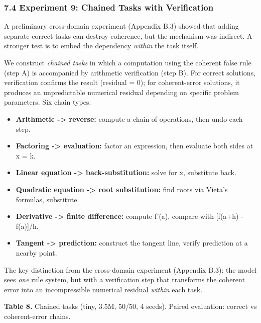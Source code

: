 \documentclass[
  11pt,
]{article}
\providecommand{\tightlist}{%
  \setlength{\itemsep}{0pt}\setlength{\parskip}{0pt}}
\begin{document}
\subsubsection{7.4 Experiment 9: Chained Tasks with
Verification}\label{experiment-9-chained-tasks-with-verification}

A preliminary cross-domain experiment (Appendix B.3) showed that adding
separate correct tasks can destroy coherence, but the mechanism was
indirect. A stronger test is to embed the dependency \emph{within} the
task itself.

We construct \emph{chained tasks} in which a computation using the
coherent false rule (step A) is accompanied by arithmetic verification
(step B). For correct solutions, verification confirms the result
(residual = 0); for coherent-error solutions, it produces an
unpredictable numerical residual depending on specific problem
parameters. Six chain types:

\begin{itemize}
\tightlist
\item
  \textbf{Arithmetic -\textgreater{} reverse:} compute a chain of
  operations, then undo each step.
\item
  \textbf{Factoring -\textgreater{} evaluation:} factor an expression,
  then evaluate both sides at x = k.
\item
  \textbf{Linear equation -\textgreater{} back-substitution:} solve for
  x, substitute back.
\item
  \textbf{Quadratic equation -\textgreater{} root substitution:} find
  roots via Vieta's formulas, substitute.
\item
  \textbf{Derivative -\textgreater{} finite difference:} compute f'(a),
  compare with {[}f(a+h) - f(a){]}/h.
\item
  \textbf{Tangent -\textgreater{} prediction:} construct the tangent
  line, verify prediction at a nearby point.
\end{itemize}

The key distinction from the cross-domain experiment (Appendix B.3): the
model sees \emph{one} rule system, but with a verification step that
transforms the coherent error into an incompressible numerical residual
\emph{within} each task.

\textbf{Table 8.} Chained tasks (tiny, 3.5M, 50/50, 4 seeds). Paired
evaluation: correct vs coherent-error chains.
\end{document}
